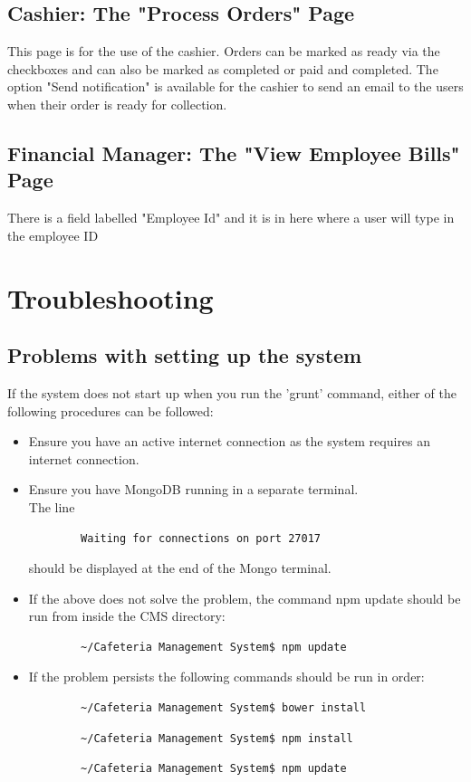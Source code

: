 \documentclass[a4paper,12pt]{article}
\begin{document}
\subsection{Cashier: The "Process Orders" Page}
This page is for the use of the cashier. Orders can be marked as ready via the checkboxes and can also be marked as completed or paid and completed. The option "Send notification" is available for the cashier to send an email to the users when their order is ready for collection.

\subsection{Financial Manager: The "View Employee Bills" Page}
There is a field labelled "Employee Id" and it is in here where a user will type in the employee ID 

\section{Troubleshooting}
\subsection{Problems with setting up the system}
If the system does not start up when you run the 'grunt' command, either of the following procedures can be followed:
\begin{itemize}
\item Ensure you have an active internet connection as the system requires an internet connection.
\item Ensure you have MongoDB running in a separate terminal. \\
	The line \begin{verbatim}
		Waiting for connections on port 27017
	\end{verbatim} should be displayed at the end of the Mongo terminal.
\item If the above does not solve the problem, the command npm update should be run from inside the CMS directory:
	\begin{verbatim}
		~/Cafeteria Management System$ npm update
	\end{verbatim}
\item If the problem persists the following commands should be run in order:
	\begin{verbatim}
		~/Cafeteria Management System$ bower install
	\end{verbatim} 
	\begin{verbatim}
		~/Cafeteria Management System$ npm install
	\end{verbatim} 
	\begin{verbatim}
		~/Cafeteria Management System$ npm update
	\end{verbatim}
\end{itemize}
\end{document}
